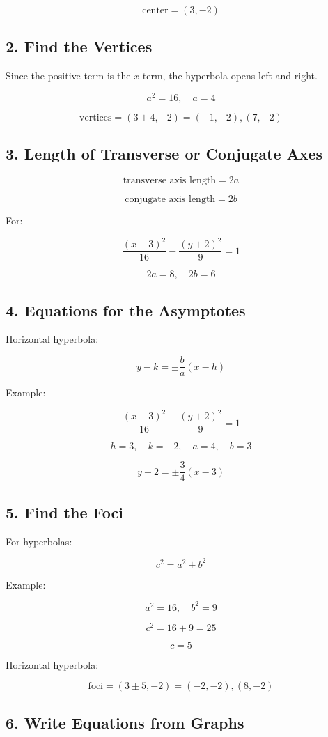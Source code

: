 \documentclass[11pt]{article}
\begin{document}
\[
\text{center}=(3,-2)
\]

\subsection*{2. Find the Vertices}

Since the positive term is the \(x\)-term, the hyperbola opens left and right.

\[
a^2=16,\quad a=4
\]

\[
\text{vertices}=(3\pm4,-2)=(-1,-2),(7,-2)
\]

\subsection*{3. Length of Transverse or Conjugate Axes}

\[
\text{transverse axis length}=2a
\]

\[
\text{conjugate axis length}=2b
\]

For:

\[
\frac{(x-3)^2}{16}-\frac{(y+2)^2}{9}=1
\]

\[
2a=8,\quad 2b=6
\]

\subsection*{4. Equations for the Asymptotes}

Horizontal hyperbola:

\[
y-k=\pm\frac{b}{a}(x-h)
\]

Example:

\[
\frac{(x-3)^2}{16}-\frac{(y+2)^2}{9}=1
\]

\[
h=3,\quad k=-2,\quad a=4,\quad b=3
\]

\[
y+2=\pm\frac{3}{4}(x-3)
\]

\subsection*{5. Find the Foci}

For hyperbolas:

\[
c^2=a^2+b^2
\]

Example:

\[
a^2=16,\quad b^2=9
\]

\[
c^2=16+9=25
\]

\[
c=5
\]

Horizontal hyperbola:

\[
\text{foci}=(3\pm5,-2)=(-2,-2),(8,-2)
\]

\subsection*{6. Write Equations from Graphs}
\end{document}
